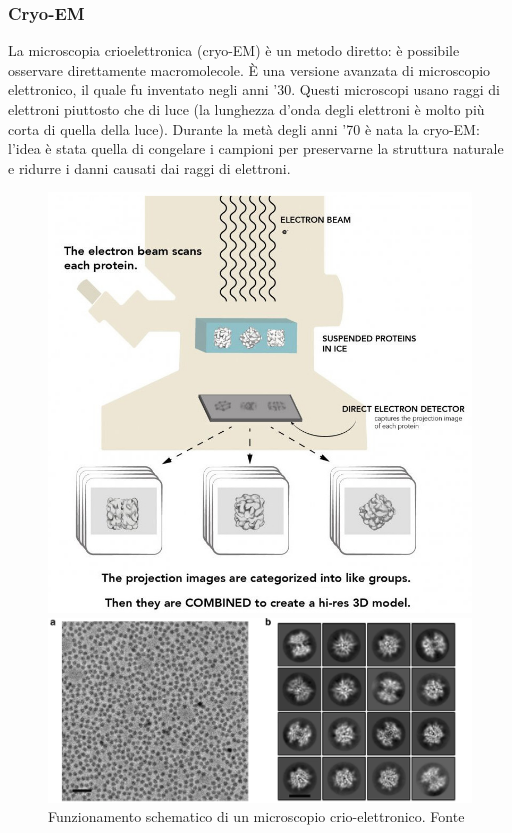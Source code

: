 {\subsubsection{Cryo-EM}

\par La microscopia crioelettronica (cryo-EM) è un metodo diretto: è possibile osservare direttamente macromolecole. È una versione avanzata di microscopio elettronico, il quale fu inventato negli anni '30. Questi microscopi usano raggi di elettroni piuttosto che di luce (la lunghezza d'onda degli elettroni è molto più corta di quella della luce). Durante la metà degli anni '70 è nata la cryo-EM: l'idea è stata quella di congelare i campioni per preservarne la struttura naturale e ridurre i danni causati dai raggi di elettroni.

\begin{figure}[!htb]
	\centering
	\includegraphics[scale=1.1]{images/cryo-em.jpg}
	\caption{Funzionamento schematico di un microscopio crio-elettronico. Fonte\cite{cryoEMbasics}}
	\label{fig:cryo-em-basics}
	\endminipage\hfill
	\centering
	\includegraphics[scale=0.136]{images/cryo-em-classi.png}

\end{figure}}
